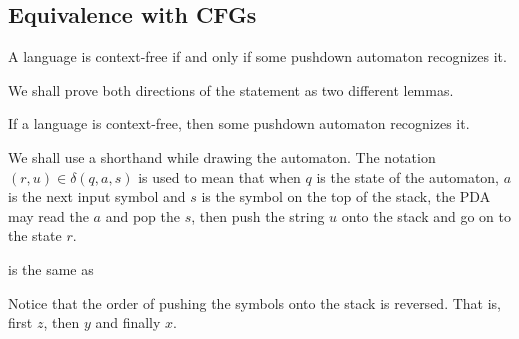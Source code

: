 \subsection{Equivalence with CFGs}
\begin{theorem}
    A language is context-free if and only if some pushdown automaton recognizes it.
\end{theorem}

We shall prove both directions of the statement as two different lemmas.

\begin{lemma}
    If a language is context-free, then some pushdown automaton recognizes it.
\end{lemma}

We shall use a shorthand while drawing the automaton. The notation $(r,u)\in\delta(q,a,s)$ is used to mean that when $q$ is the state of the automaton, $a$ is the next input symbol and $s$ is the symbol on the top of the stack, the PDA may read the $a$ and pop the $s$, then push the string $u$ onto the stack and go on to the state $r$.

\begin{center}
\end{center}
is the same as 
\begin{center}
\end{center}
Notice that the order of pushing the symbols onto the stack is reversed. That is, first $z$, then $y$ and finally $x$.

